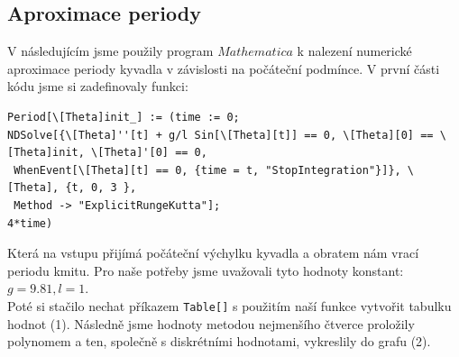 \documentclass[reqno, a4paper]{amsart}
\begin{document}
\subsection{Aproximace periody}
\label{sec:aprox-periody}
V následujícím jsme použily program $Mathematica$ k nalezení numerické aproximace periody kyvadla v závislosti na počáteční podmínce.
V první části kódu jsme si zadefinovaly funkci:
\begin{verbatim}
Period[\[Theta]init_] := (time := 0; 
NDSolve[{\[Theta]''[t] + g/l Sin[\[Theta][t]] == 0, \[Theta][0] == \[Theta]init, \[Theta]'[0] == 0, 
 WhenEvent[\[Theta][t] == 0, {time = t, "StopIntegration"}]}, \[Theta], {t, 0, 3 },
 Method -> "ExplicitRungeKutta"];
4*time)
\end{verbatim}
Která na vstupu přijímá počáteční výchylku kyvadla a obratem nám vrací periodu kmitu. Pro naše potřeby jsme uvažovali tyto hodnoty konstant: $g=9.81, l=1$.\\
Poté si stačilo nechat příkazem \verb|Table[]| s použitím naší funkce vytvořit tabulku hodnot (1). Následně jsme hodnoty metodou nejmenšího čtverce proložily polynomem a ten, společně s diskrétními hodnotami, vykreslily do grafu (2). 
\end{document}
